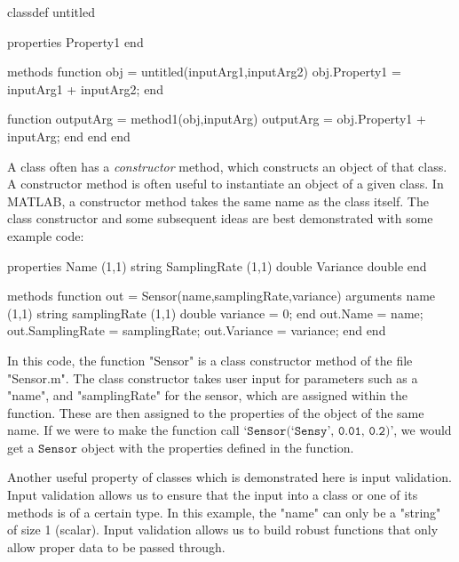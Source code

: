 \documentclass[10pt, openany, titlepage]{book}
\theoremstyle{definition}
\newcounter{example}[chapter]
\begin{document}
\begin{matlabscript}{}
classdef untitled

    properties
        Property1
    end

    methods
        function obj = untitled(inputArg1,inputArg2)
            obj.Property1 = inputArg1 + inputArg2;
        end

        function outputArg = method1(obj,inputArg)
            outputArg = obj.Property1 + inputArg;
        end
    end
end
\end{matlabscript}

A class often has a \textit{constructor} method, which constructs an object of that class. A constructor method is often useful to instantiate an object of a given class. In MATLAB, a constructor method takes the same name as the class itself. The class constructor and some subsequent ideas are best demonstrated with some example code:

\begin{matlabscript}{}
    properties
        Name (1,1) string
        SamplingRate (1,1) double
        Variance double
    end

    methods
        function out = Sensor(name,samplingRate,variance)
            arguments
                name (1,1) string
                samplingRate (1,1) double   
                variance = 0;
            end
            out.Name = name;
            out.SamplingRate = samplingRate;
            out.Variance = variance;
        end
    end
\end{matlabscript}


In this code, the function "Sensor" is a class constructor method of the file "Sensor.m". The class constructor takes user input for parameters such as a "name", and "samplingRate" for the sensor, which are assigned within the function. These are then assigned to the properties of the object of the same name. If we were to make the function call `$\texttt{Sensor(`Sensy', 0.01, 0.2)}$', we would get a $\texttt{Sensor}$ object with the properties defined in the function.

Another useful property of classes which is demonstrated  here is input validation. Input validation allows us to ensure that the input into a class or one of its methods is of a certain type. In this example, the "name" can only be a "string" of size 1 (scalar). Input validation allows us to build robust functions that only allow proper data to be passed through.
\end{document}

